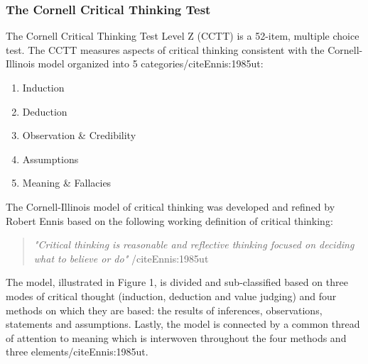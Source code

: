 \subsubsection{The Cornell Critical Thinking Test}

The Cornell Critical Thinking Test Level Z (CCTT) is a 52-item, multiple choice test. The CCTT measures aspects of critical thinking consistent with the Cornell-Illinois model organized into 5 categories/cite{Ennis:1985ut}:

\begin{enumerate}
\item Induction
\item Deduction
\item Observation & Credibility
\item Assumptions
\item Meaning & Fallacies
\end{enumerate}

The Cornell-Illinois model of critical thinking was developed and refined by Robert Ennis based on the following working definition of critical thinking:

\begin{quote}\textit{"Critical thinking is reasonable and reflective thinking focused on deciding what to believe or do"} /cite{Ennis:1985ut}\end{quote}

The model, illustrated in Figure 1, is divided and sub-classified based on three modes of critical thought (induction, deduction and value judging) and four methods on which they are based: the results of inferences, observations, statements and assumptions. Lastly, the model is connected by a common thread of attention to meaning which is interwoven throughout the four methods and three elements/cite{Ennis:1985ut}. 

